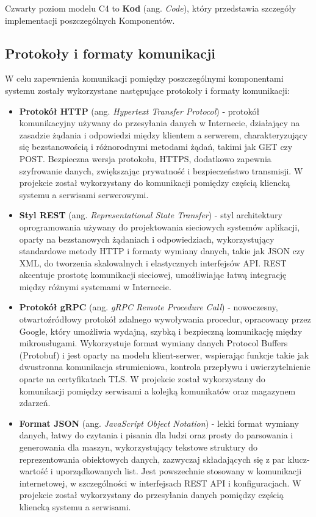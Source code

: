 Czwarty poziom modelu C4 to \textbf{Kod} (ang. \textit{Code}), który przedstawia szczegóły implementacji poszczególnych Komponentów.

\subsection{Protokoły i formaty komunikacji}

W celu zapewnienia komunikacji pomiędzy poszczególnymi komponentami systemu zostały wykorzystane następujące protokoły i formaty komunikacji:

\begin{itemize}

    \item \textbf{Protokół HTTP} (ang. \textit{Hypertext Transfer Protocol}) - protokół komunikacyjny używany do przesyłania danych w Internecie, działający na zasadzie żądania i odpowiedzi między klientem a serwerem, charakteryzujący się bezstanowością i różnorodnymi metodami żądań, takimi jak GET czy POST. Bezpieczna wersja protokołu, HTTPS, dodatkowo zapewnia szyfrowanie danych, zwiększając prywatność i bezpieczeństwo transmisji. W projekcie został wykorzystany do komunikacji pomiędzy częścią kliencką systemu a serwisami serwerowymi.

    \item \textbf{Styl REST} (ang. \textit{Representational State Transfer}) - styl architektury oprogramowania używany do projektowania sieciowych systemów aplikacji, oparty na bezstanowych żądaniach i odpowiedziach, wykorzystujący standardowe metody HTTP i formaty wymiany danych, takie jak JSON czy XML, do tworzenia skalowalnych i elastycznych interfejsów API. REST akcentuje prostotę komunikacji sieciowej, umożliwiając łatwą integrację między różnymi systemami w Internecie.
    
    \item \textbf{Protokół gRPC} (ang. \textit{gRPC Remote Procedure Call}) - nowoczesny, otwartoźródłowy protokół zdalnego wywoływania procedur, opracowany przez Google, który umożliwia wydajną, szybką i bezpieczną komunikację między mikrousługami. Wykorzystuje format wymiany danych Protocol Buffers (Protobuf) \cite{protobuf} i jest oparty na modelu klient-serwer, wspierając funkcje takie jak dwustronna komunikacja strumieniowa, kontrola przepływu i uwierzytelnienie oparte na certyfikatach TLS. W projekcie został wykorzystany do komunikacji pomiędzy serwisami a kolejką komunikatów oraz magazynem zdarzeń.

    \item \textbf{Format JSON} \cite{json} (ang. \textit{JavaScript Object Notation}) - lekki format wymiany danych, łatwy do czytania i pisania dla ludzi oraz prosty do parsowania i generowania dla maszyn, wykorzystujący tekstowe struktury do reprezentowania obiektowych danych, zazwyczaj składających się z par klucz-wartość i uporządkowanych list. Jest powszechnie stosowany w komunikacji internetowej, w szczególności w interfejsach REST API i konfiguracjach. W projekcie został wykorzystany do przesyłania danych pomiędzy częścią kliencką systemu a serwisami.
    

\end{itemize}
